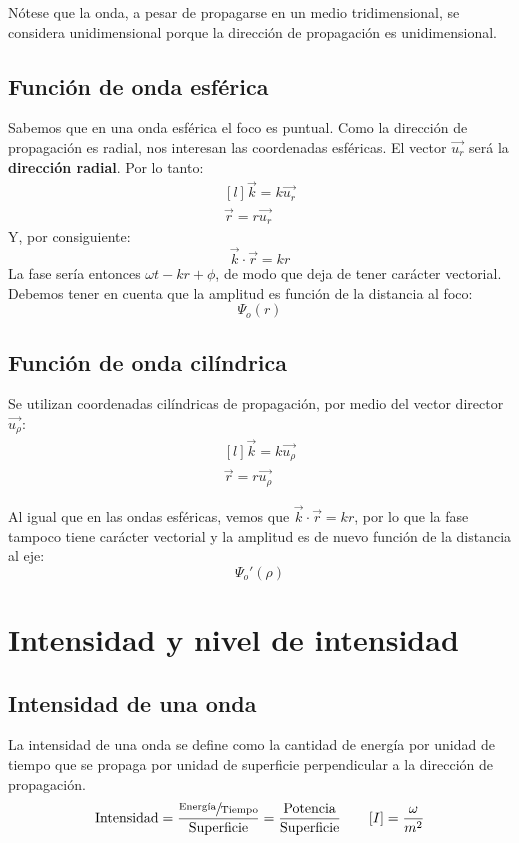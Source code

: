 \documentclass[a4paper]{book}
\begin{document}
Nótese que la onda, a pesar de propagarse en un medio tridimensional, se considera unidimensional porque la dirección de propagación es unidimensional.

\subsection{Función de onda esférica}
Sabemos que en una onda esférica el foco es puntual. Como la dirección de propagación es radial, nos interesan las coordenadas esféricas. El vector $\vec{u_r}$ será la \textbf{dirección radial}. Por lo tanto:
\[\begin{matrix*}[l]
		\vec{k} = k\vec{u_r}\\[5pt]
		\vec{r} = r\vec{u_r}
	\end{matrix*} \]
Y, por consiguiente:
\[\vec{k}\cdot \vec{r} = kr\]
La fase sería entonces $\omega t -kr +\phi$, de modo que deja de tener carácter vectorial. Debemos tener en cuenta que la amplitud es función de la distancia al foco:
\[\Psi_o(r)\]

\subsection{Función de onda cilíndrica}
Se utilizan coordenadas cilíndricas de propagación, por medio del vector director $\vec{u_\rho}$:
\[\begin{matrix*}[l]
		\vec{k} = k\vec{u_\rho}\\[5pt]
		\vec{r} = r\vec{u_\rho}
	\end{matrix*}\]

Al igual que en las ondas esféricas, vemos que $\vec{k}\cdot \vec{r} = kr$, por lo que la fase tampoco tiene carácter vectorial y la amplitud es de nuevo función de la distancia al eje:
\[\Psi_o'(\rho )\]

\section{Intensidad y nivel de intensidad}
\subsection{Intensidad de una onda}
La intensidad de una onda se define como la cantidad de energía por unidad de tiempo que se propaga por unidad de superficie perpendicular a la dirección de propagación.
\[\text{Intensidad} = \frac{\sfrac{\text{Energía}}{\text{Tiempo}}}{\text{Superficie}} = \frac{\text{Potencia}}{\text{Superficie}} \qquad [I ] = \frac{\omega}{m^2}\]
\end{document}
